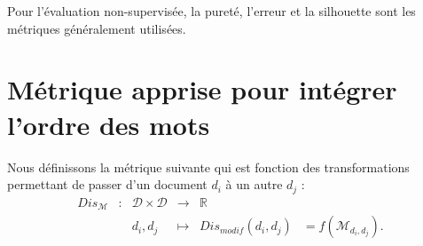  Pour l'évaluation non-supervisée, la pureté, l'erreur et la silhouette sont les métriques généralement utilisées.







\section{Métrique apprise pour intégrer l'ordre des mots}
Nous définissons la métrique suivante qui est fonction des transformations permettant de passer d'un document $d_i$ à un autre $d_j$ :
\begin{equation}
\begin{array}{cccccc}
Dis_\mathcal{M} & : & \mathcal{D} \times \mathcal{D} & \to & \mathbb{R} & \\
& & d_i, d_j & \mapsto & Dis_{modif}(d_i, d_j) & = f(\mathcal{M}_{d_i, d_j}). \\
\end{array}
\end{equation}

